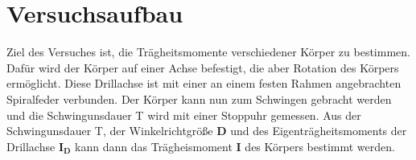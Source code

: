 \section{Versuchsaufbau}
\label{sec:Versuchsaufbau}
Ziel des Versuches ist, die Trägheitsmomente verschiedener Körper zu bestimmen. 
Dafür wird der Körper auf einer Achse befestigt, die aber Rotation des Körpers ermöglicht.
Diese Drillachse ist mit einer an einem festen Rahmen angebrachten Spiralfeder verbunden.
Der Körper kann nun zum Schwingen gebracht werden und die Schwingunsdauer T wird mit einer Stoppuhr gemessen.
Aus der Schwingunsdauer T, der Winkelrichtgröße $\symbf{D}$ und des Eigenträgheitsmoments der Drillachse $\symbf{I_D}$ 
kann dann das Trägheismoment $\symbf{I}$ des Körpers bestimmt werden.